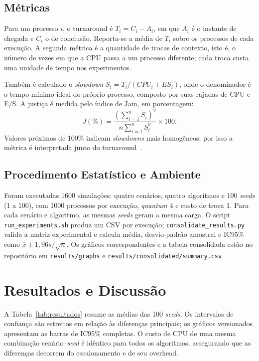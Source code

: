 \documentclass[conference]{IEEEtran}
\begin{document}
\subsection{Métricas}

Para um processo $i$, o turnaround é $T_i=C_i-A_i$, em que $A_i$ é o instante de chegada e $C_i$ o de conclusão. Reporta-se a média de $T_i$ sobre os processos de cada execução. A segunda métrica é a quantidade de trocas de contexto, isto é, o número de vezes em que a CPU passa a um processo diferente; cada troca custa uma unidade de tempo nos experimentos.

Também é calculado o \textit{slowdown} $S_i=T_i/(CPU_i+ES_i)$, onde o denominador é o tempo mínimo ideal do próprio processo, composto por suas rajadas de CPU e E/S. A justiça é medida pelo índice de Jain, em porcentagem:
\begin{equation}
J(\%) = \frac{(\sum_{i=1}^{n}S_i)^2}{n\sum_{i=1}^{n}S_i^2}\times100.
\end{equation}
Valores próximos de 100\% indicam \textit{slowdowns} mais homogêneos; por isso a métrica é interpretada junto do turnaround~\cite{jain1984}.

\subsection{Procedimento Estatístico e Ambiente}

Foram executadas 1600 simulações: quatro cenários, quatro algoritmos e 100 \textit{seeds} (1 a 100), com 1000 processos por execução, \textit{quantum} 4 e custo de troca 1. Para cada cenário e algoritmo, as mesmas \textit{seeds} geram a mesma carga. O script \texttt{run\_experiments.sh} produz um CSV por execução; \texttt{consolidate\_results.py} valida a matriz experimental e calcula média, desvio-padrão amostral e IC95\% como $\bar{x}\pm1{,}96s/\sqrt{n}$. Os gráficos correspondentes e a tabela consolidada estão no repositório em \texttt{results/graphs} e \texttt{results/consolidated/summary.csv}.

\section{Resultados e Discussão}

A Tabela~\ref{tab:resultados} resume as médias das 100 \textit{seeds}. Os intervalos de confiança são estreitos em relação às diferenças principais; os gráficos versionados apresentam as barras de IC95\% completas. O custo de CPU de uma mesma combinação cenário--\textit{seed} é idêntico para todos os algoritmos, assegurando que as diferenças decorrem do escalonamento e de seu overhead.
\end{document}
